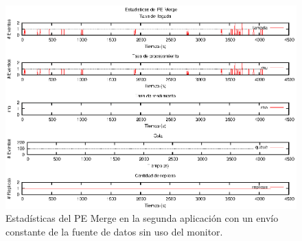 \begin{figure}[p]
\centering
    \includegraphics[scale=1.1]{images/exp/app2/uniform/sm/statusMergePE.eps}
    \caption{Estadísticas del PE Merge en la segunda aplicación con un envío constante de la fuente de datos sin uso del monitor.}
    \label{fig:app2-uniform-statusMergePE-sm}
\end{figure}

